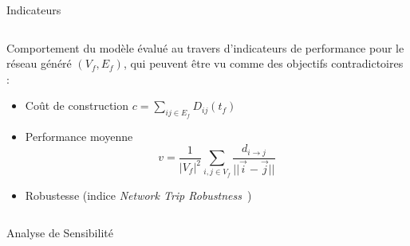 \documentclass{beamer}
\begin{document}
\begin{frame}{}
\begin{columns}[t]
\begin{column}{.49\textwidth}
        
        \begin{block}{Indicateurs}
       \vspace{-2cm}
        \begin{columns}[t]
        \begin{column}{.95\textwidth}
        \begin{justify}
          Comportement du modèle évalué au travers d'indicateurs de performance pour le réseau généré $(V_f,E_f)$, qui peuvent être vu comme des objectifs contradictoires :
          \bigskip
          \begin{itemize}
          \item Coût de construction $c=\sum_{ij\in E_f}D_{ij}(t_f)$
          \bigskip
          \item \begin{justify}Performance moyenne~\cite{banos2012towards}
          \[
          v=\frac{1}{|V_f|^2}\sum_{i,j\in V_f}\frac{d_{i\rightarrow j}}{||\vec{i}-\vec{j}||}
          \]
          \end{justify}
          \bigskip
          \item Robustesse (indice \textit{Network Trip Robustness}~\cite{sullivan2010identifying})
          \end{itemize}

          \end{justify}
          \end{column}
          \end{columns}
        \end{block}
        
        
        \begin{block}{Analyse de Sensibilité}
       \vspace{-1cm}
        \begin{columns}[t]
        \begin{column}{.47\textwidth}
                    

\end{column}
\end{columns}
\end{block}
\end{column}
\end{columns}
\end{frame}
\end{document}
